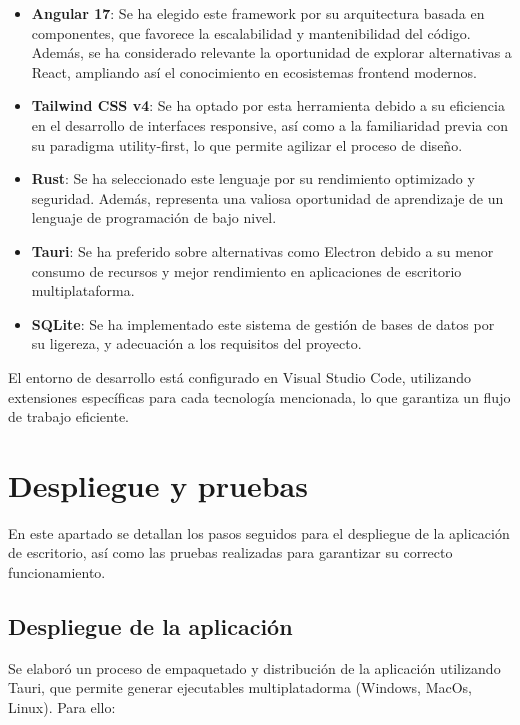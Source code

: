 \documentclass[11pt, a4paper]{article}
\begin{document}
        \begin{itemize}
            \item \textbf{Angular 17}: Se ha elegido este framework por su arquitectura basada en componentes, que favorece la escalabilidad y mantenibilidad del código. Además, se ha considerado relevante la oportunidad de explorar alternativas a React, ampliando así el conocimiento en ecosistemas frontend modernos.
            \item \textbf{Tailwind CSS v4}: Se ha optado por esta herramienta debido a su eficiencia en el desarrollo de interfaces responsive, así como a la familiaridad previa con su paradigma utility-first, lo que permite agilizar el proceso de diseño.
            \item \textbf{Rust}: Se ha seleccionado este lenguaje por su rendimiento optimizado y seguridad. Además, representa una valiosa oportunidad de aprendizaje de un lenguaje de programación de bajo nivel.
            \item \textbf{Tauri}: Se ha preferido sobre alternativas como Electron debido a su menor consumo de recursos y mejor rendimiento en aplicaciones de escritorio multiplataforma.
            \item \textbf{SQLite}: Se ha implementado este sistema de gestión de bases de datos por su ligereza, y adecuación a los requisitos del proyecto.
        \end{itemize}

    El entorno de desarrollo está configurado en Visual Studio Code, utilizando extensiones específicas para cada tecnología mencionada, lo que garantiza un flujo de trabajo eficiente.

\section{Despliegue y pruebas}

En este apartado se detallan los pasos seguidos para el despliegue de la aplicación de escritorio, así como las pruebas realizadas para garantizar su correcto funcionamiento.

        \subsection{Despliegue de la aplicación}

        Se elaboró un proceso de empaquetado y distribución de la aplicación utilizando Tauri, que permite generar ejecutables multiplatadorma (Windows, MacOs, Linux). Para ello:
\end{document}
